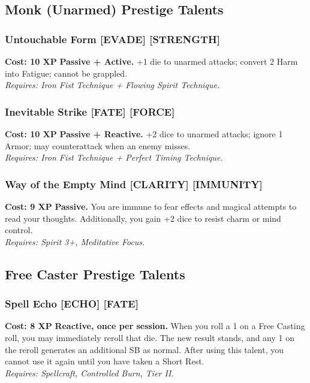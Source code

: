 \subsection*{Monk (Unarmed) Prestige Talents}
\label{sec:prestige-monk}

\subsubsection*{Untouchable Form \textnormal{[EVADE] [STRENGTH]}}
\label{talent:untouchable-form}
\textbf{Cost: 10 XP} \textbf{Passive + Active.} +1 die to unarmed attacks; convert 2 Harm into Fatigue; cannot be grappled. \\
\textit{Requires: Iron Fist Technique + Flowing Spirit Technique.}

\subsubsection*{Inevitable Strike \textnormal{[FATE] [FORCE]}}
\label{talent:inevitable-strike}
\textbf{Cost: 10 XP} \textbf{Passive + Reactive.} +2 dice to unarmed attacks; ignore 1 Armor; may counterattack when an enemy misses. \\
\textit{Requires: Iron Fist Technique + Perfect Timing Technique.}

\subsubsection*{Way of the Empty Mind \textnormal{[CLARITY] [IMMUNITY]}}
\label{talent:way-of-the-empty-mind}
\textbf{Cost: 9 XP} \textbf{Passive.} You are immune to fear effects and magical attempts to read your thoughts. Additionally, you gain +2 dice to resist charm or mind control. \\
\textit{Requires: Spirit 3+, Meditative Focus.}

\subsection*{Free Caster Prestige Talents}
\label{sec:prestige-freecaster}

\subsubsection*{Spell Echo \textnormal{[ECHO] [FATE]}}
\label{talent:spell-echo}
\textbf{Cost: 8 XP} \textbf{Reactive, once per session.} When you roll a 1 on a Free Casting roll, you may immediately reroll that die. The new result stands, and any 1 on the reroll generates an additional SB as normal. After using this talent, you cannot use it again until you have taken a Short Rest. \\
\textit{Requires: Spellcraft, Controlled Burn, Tier II.}

